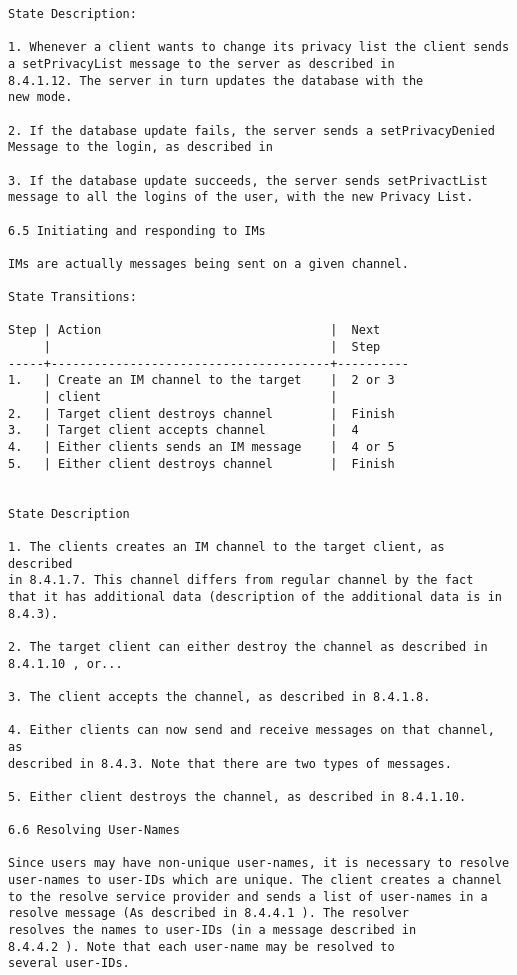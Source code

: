 \documentclass[titlepage,oneside]{book}
\begin{document}
\begin{verbatim}
State Description:

1. Whenever a client wants to change its privacy list the client sends
a setPrivacyList message to the server as described in
8.4.1.12. The server in turn updates the database with the
new mode.

2. If the database update fails, the server sends a setPrivacyDenied
Message to the login, as described in 

3. If the database update succeeds, the server sends setPrivactList
message to all the logins of the user, with the new Privacy List.

6.5 Initiating and responding to IMs

IMs are actually messages being sent on a given channel.

State Transitions:

Step | Action                                |  Next
     |                                       |  Step
-----+---------------------------------------+----------
1.   | Create an IM channel to the target    |  2 or 3
     | client                                |
2.   | Target client destroys channel        |  Finish
3.   | Target client accepts channel         |  4
4.   | Either clients sends an IM message    |  4 or 5
5.   | Either client destroys channel        |  Finish


State Description

1. The clients creates an IM channel to the target client, as described
in 8.4.1.7. This channel differs from regular channel by the fact
that it has additional data (description of the additional data is in
8.4.3).

2. The target client can either destroy the channel as described in
8.4.1.10 , or...

3. The client accepts the channel, as described in 8.4.1.8.

4. Either clients can now send and receive messages on that channel, as
described in 8.4.3. Note that there are two types of messages.

5. Either client destroys the channel, as described in 8.4.1.10.

6.6 Resolving User-Names

Since users may have non-unique user-names, it is necessary to resolve
user-names to user-IDs which are unique. The client creates a channel
to the resolve service provider and sends a list of user-names in a
resolve message (As described in 8.4.4.1 ). The resolver
resolves the names to user-IDs (in a message described in
8.4.4.2 ). Note that each user-name may be resolved to
several user-IDs.


\end{verbatim}
\end{document}
